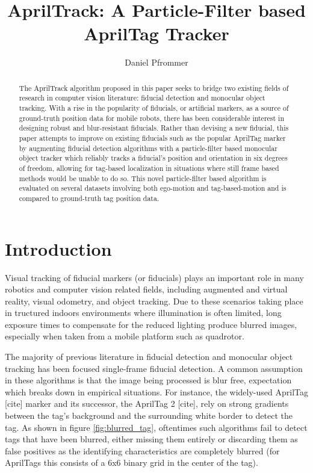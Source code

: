 \documentclass[letterpaper, 10 pt, conference]{ieeeconf}
\title{\textbf{AprilTrack: A Particle-Filter based AprilTag Tracker}}
\author{Daniel Pfrommer}
\date{}
\begin{document}
\maketitle

\begin{abstract}

	The AprilTrack algorithm proposed in this paper seeks to bridge two existing fields of research in computer vision literature: fiducial detection and monocular object tracking. With a rise in the popularity of fiducials, or artificial markers, as a source of ground-truth position data for mobile robots, there has been considerable interest in designing robust and blur-resistant fiducials. Rather than devising a new fiducial, this paper attempts to improve on existing fiducials such as the popular AprilTag marker by augmenting fiducial detection algorithms with a particle-filter based monocular object tracker which reliably tracks a fiducial's position and orientation in six degrees of freedom, allowing for tag-based localization in situations where still frame based methods would be unable to do so. This novel particle-filter based algorithm is evaluated on several datasets involving both ego-motion and tag-based-motion and is compared to ground-truth tag position data.
	
\end{abstract}

\section{Introduction}


Visual tracking of fiducial markers (or fiducials) plays an important role in many robotics and computer vision related fields, including augmented and virtual reality, visual odometry, and object tracking. Due to these scenarios taking place in tructured indoors environments where illumination is often limited, long exposure times to compensate for the reduced lighting produce blurred images, especially when taken from a mobile platform such as quadrotor.


 The majority of previous literature in fiducial detection and monocular object tracking has been focused single-frame fiducial detection. A common assumption in these algorithms is that the image being processed is blur free, expectation which breaks down in empirical situations. For instance, the widely-used AprilTag [cite] marker and its successor, the AprilTag 2 [cite], rely on strong gradients between the tag's background and the surrounding white border to detect the tag. As shown in figure \ref{fig:blurred_tag}, oftentimes such algorithms fail to detect tags that have been blurred, either missing them entirely or discarding them as false positives as the identifying characteristics are completely blurred (for AprilTags this consists of a 6x6 binary grid in the center of the tag).
 
\end{document}
